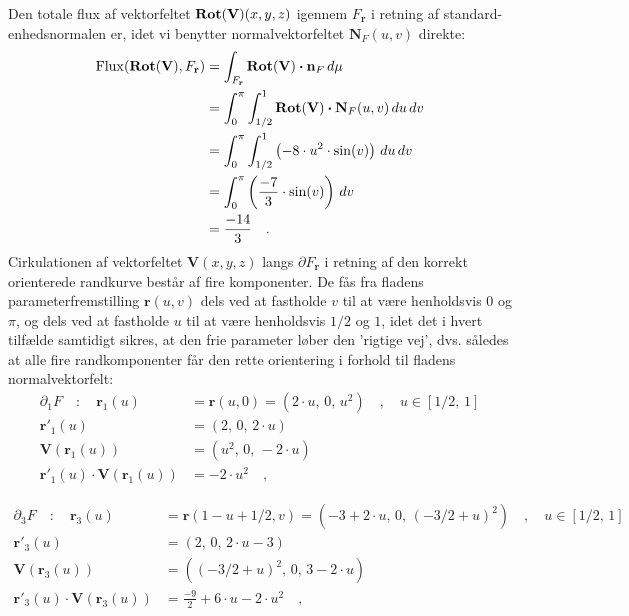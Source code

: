 \begin{example}
Den totale flux af vektorfeltet $\operatorname{\mathbf{Rot}}(\mathbf{V})(x,y,z)$ igennem $F_{\mathbf{r}}$ i retning af standard-enhedsnormalen er, idet vi benytter
normalvektorfeltet $\mathbf{N}_{F}(u,v)$ direkte:
\begin{equation}
\begin{aligned}
\operatorname{Flux}(\operatorname{\mathbf{Rot}}(\mathbf{V}), F_{\mathbf{r}} ) &= \int_{F_{\mathbf{r}}}\operatorname{\mathbf{Rot}}(\mathbf{V}) \bm{\cdot} \mathbf{n}_{F} \, d\mu \\
&= \int_{0}^{\pi}\int_{1/2}^{1} \operatorname{\mathbf{Rot}}(\mathbf{V}) \bm{\cdot} \mathbf{N}_{F}(u,v) \, du \, dv \\
&=  \int_{0}^{\pi}\int_{1/2}^{1} \left(-8\cdot u^{2} \cdot \sin(v) \right)  \, du \, dv \\
&= \int_{0}^{\pi} \left( \frac{-7}{3} \cdot \sin(v) \right)\, dv \\
&= \frac{-14}{3}\quad .
\end{aligned}
\end{equation}
Cirkulationen af vektorfeltet $\mathbf{V}(x,y,z)$ langs $\partial F_{\mathbf{r}}$ i retning af den korrekt orienterede randkurve består af fire
komponenter. De fås fra fladens parameterfremstilling $\mathbf{r}(u,v)$ dels ved at fastholde $v$ til at være henholdsvis $0$ og $\pi$, og dels ved at fastholde $u$ til at være henholdsvis $1/2$ og $1$,  idet det i hvert tilfælde samtidigt sikres, at den frie parameter løber den 'rigtige vej', dvs. således at alle fire randkomponenter får den rette orientering i forhold til fladens normalvektorfelt:
\begin{equation}
\begin{aligned}
\partial_{1} F \quad : \quad \mathbf{r}_{1}(u) &= \mathbf{r}(u, 0) = (2\cdot u , \, 0 , \, u^{2}) \quad , \quad  u \in [1/2, \, 1] \\
\mathbf{r}'_{1}(u) &= (2, \, 0, \, 2\cdot u)\\
\mathbf{V}(\mathbf{r}_{1}(u)) &= (u^{2},\, 0, \, -2\cdot u) \\
\mathbf{r}'_{1}(u)\cdot \mathbf{V}(\mathbf{r}_{1}(u)) &= -2\cdot u^{2} \quad ,
\end{aligned}
\end{equation}

\begin{equation}
\begin{aligned}
\partial_{3} F \quad : \quad \mathbf{r}_{3}(u) &= \mathbf{r}(1 - u + 1/2, v) = (-3 + 2 \cdot u, \, 0, \, (-3/2 + u)^{2})\quad , \quad  u \in [1/2, \, 1] \\
\mathbf{r}'_{3}(u) &= (2, \, 0 , \, 2\cdot u - 3) \\
\mathbf{V}(\mathbf{r}_{3}(u)) &= ((-3/2 + u)^{2}, \, 0, \, 3 - 2\cdot u)  \\
\mathbf{r}'_{3}(u)\cdot \mathbf{V}(\mathbf{r}_{3}(u)) &= \frac{-9}{2} + 6\cdot u - 2\cdot u^{2} \quad ,
\end{aligned}
\end{equation}


\end{example}
